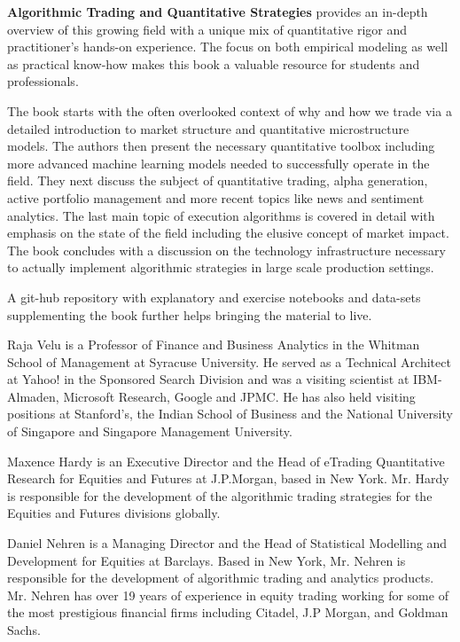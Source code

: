 \pagestyle{empty}

\textbf{Algorithmic Trading and Quantitative Strategies} provides an in-depth overview of this growing field with a unique mix of quantitative rigor and practitioner’s hands-on experience. The focus on both empirical modeling as well as practical know-how makes this book a valuable resource for students and professionals.


The book starts with the often overlooked context of why and how we trade via a detailed introduction to market structure and quantitative microstructure models. The authors then
present the necessary quantitative toolbox including more advanced machine learning models needed to successfully operate in the field. They next discuss the subject of quantitative trading, alpha generation, active portfolio management and more recent topics like news and sentiment analytics. The last main topic of execution algorithms is covered in detail  with emphasis on the state of the field including the elusive concept of market impact. The book concludes with a discussion on the technology infrastructure necessary to actually implement algorithmic strategies in large scale production settings.


A git-hub repository with explanatory and exercise notebooks and data-sets supplementing the book further helps bringing the material to live.


\noindent Raja Velu is a Professor of Finance and Business Analytics in the Whitman School of Management at Syracuse University. He served as a Technical Architect at Yahoo! in the Sponsored Search Division and was a visiting scientist at IBM-Almaden, Microsoft Research, Google and JPMC. He has also held visiting positions at Stanford's, the Indian School of Business and the National University of Singapore and Singapore Management University. \medskip

\noindent Maxence Hardy is an Executive Director and the Head of eTrading Quantitative Research for Equities and Futures at J.P.Morgan, based in New York. Mr. Hardy is responsible for the development of the algorithmic trading strategies for the Equities and Futures divisions globally. \medskip

\noindent Daniel Nehren is a Managing Director and the Head of Statistical Modelling and Development for Equities at Barclays. Based in New York, Mr. Nehren is responsible for the development of algorithmic trading and analytics products. Mr. Nehren has over 19 years of experience in equity trading working for some of the most prestigious financial firms including Citadel, J.P Morgan, and Goldman Sachs. 